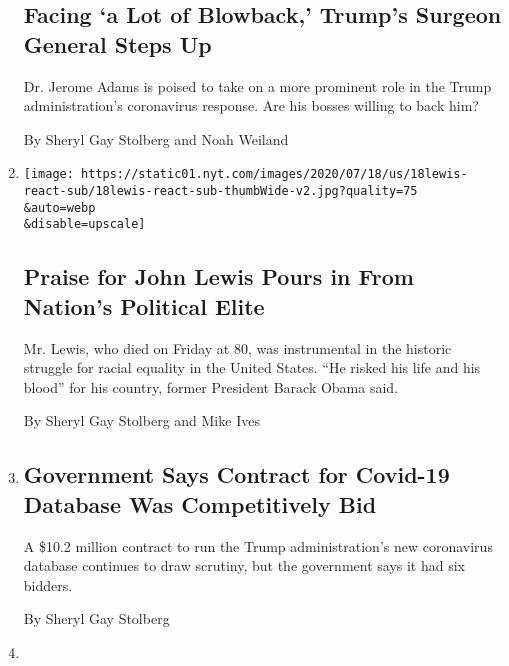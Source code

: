 \begin{enumerate}
  \hypertarget{facing-a-lot-of-blowback-trumps-surgeon-general-steps-up}{%
  \subsection{Facing `a Lot of Blowback,' Trump's Surgeon General Steps
  Up}\label{facing-a-lot-of-blowback-trumps-surgeon-general-steps-up}}

  Dr. Jerome Adams is poised to take on a more prominent role in the
  Trump administration's coronavirus response. Are his bosses willing to
  back him?

  By Sheryl Gay Stolberg and Noah Weiland
\item
  \href{/2020/07/18/us/politics/john-lewis-dies-reaction.html}{}

  \texttt{[image: https://static01.nyt.com/images/2020/07/18/us/18lewis-react-sub/18lewis-react-sub-thumbWide-v2.jpg?quality=75\\\&auto=webp\\\&disable=upscale]}

  \hypertarget{praise-for-john-lewis-pours-in-from-nations-political-elite}{%
  \subsection{Praise for John Lewis Pours in From Nation's Political
  Elite}\label{praise-for-john-lewis-pours-in-from-nations-political-elite}}

  Mr. Lewis, who died on Friday at 80, was instrumental in the historic
  struggle for racial equality in the United States. ``He risked his
  life and his blood'' for his country, former President Barack Obama
  said.

  By Sheryl Gay Stolberg and Mike Ives
\item
  \href{/2020/07/17/us/politics/coronavirus-database-trump.html}{}

  \hypertarget{government-says-contract-for-covid-19-database-was-competitively-bid}{%
  \subsection{Government Says Contract for Covid-19 Database Was
  Competitively
  Bid}\label{government-says-contract-for-covid-19-database-was-competitively-bid}}

  A \$10.2 million contract to run the Trump administration's new
  coronavirus database continues to draw scrutiny, but the government
  says it had six bidders.

  By Sheryl Gay Stolberg
\item
  \href{/2020/07/15/us/politics/coronavirus-database.html}{}


\end{enumerate}

